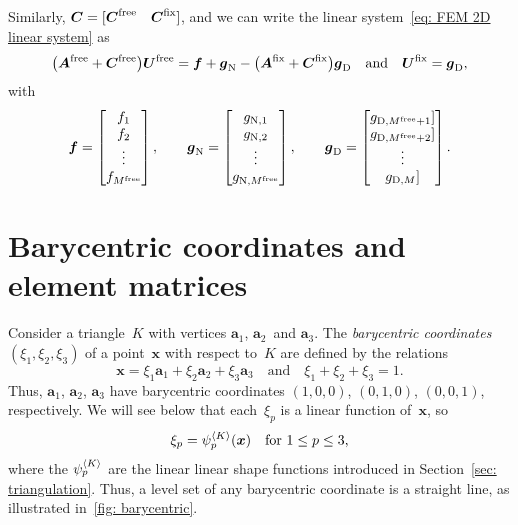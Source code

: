 Similarly, $\boldsymbol{C}=[\boldsymbol{C}^{\mathrm{free}}\quad\boldsymbol{C}^{\mathrm{fix}}]$, and 
we can write the linear system~\eqref{eq: FEM 2D linear system} as
\[
\bigl(\boldsymbol{A}^{\mathrm{free}}+\boldsymbol{C}^{\mathrm{free}}\bigr)\boldsymbol{U}^{\mathrm{free}}
    =\boldsymbol{f}+\boldsymbol{g}_{\mathrm{N}}
-\bigl(\boldsymbol{A}^{\mathrm{fix}}+\boldsymbol{C}^{\mathrm{fix}}\bigr)\boldsymbol{g}_{\mathrm{D}}
\quad\text{and}\quad
\boldsymbol{U}^{\mathrm{fix}}=\boldsymbol{g}_{\mathrm{D}},
\]
with
\[
\boldsymbol{f}=\begin{bmatrix}f_1\\ f_2\\ \vdots\\ f_{M^{\mathrm{free}}}\end{bmatrix},
\qquad
\boldsymbol{g}_{\mathrm{N}}=\begin{bmatrix}
g_{\mathrm{N},1}\\ g_{\mathrm{N},2}\\ \vdots\\ 
g_{\mathrm{N},M^{\mathrm{free}}}\end{bmatrix},
\qquad
\boldsymbol{g}_{\mathrm{D}}=\begin{bmatrix}
g_{\mathrm{D},M^{\mathrm{free}}+1}]\\ g_{\mathrm{D},M^{\mathrm{free}}+2}]\\ \vdots\\
g_{\mathrm{D},M}] 
\end{bmatrix}.
\]

\section{Barycentric coordinates and element matrices}\label{sec: barycentric}

Consider a triangle~$K$ with vertices $\boldsymbol{a}_1$, 
$\boldsymbol{a}_2$~and $\boldsymbol{a}_3$.  The \emph{barycentric coordinates} 
$(\xi_1,\xi_2,\xi_3)$ of a point~$\boldsymbol{x}$ with respect to~$K$ are 
defined by the relations
\[
\boldsymbol{x}=\xi_1\boldsymbol{a}_1+\xi_2\boldsymbol{a}_2
    +\xi_3\boldsymbol{a}_3
    \quad\text{and}\quad
\xi_1+\xi_2+\xi_3=1.    
\]
Thus, $\boldsymbol{a}_1$, $\boldsymbol{a}_2$, $\boldsymbol{a}_3$ have
barycentric coordinates $(1,0,0)$, $(0,1,0)$, $(0,0,1)$, respectively. We will 
see below that each~$\xi_p$ is a linear function of~$\boldsymbol{x}$, so 
\begin{equation}\label{eq: xi psi}
\xi_p=\psi_p^{\langle K\rangle}(\boldsymbol{x})
    \quad\text{for $1\le p\le 3$,}
\end{equation}
where the $\psi_p^{\langle K\rangle}$ are the linear linear shape functions introduced in 
Section~\ref{sec: triangulation}.  Thus, a level set of any
barycentric coordinate is a straight line, as illustrated 
in~\ref{fig: barycentric}.

